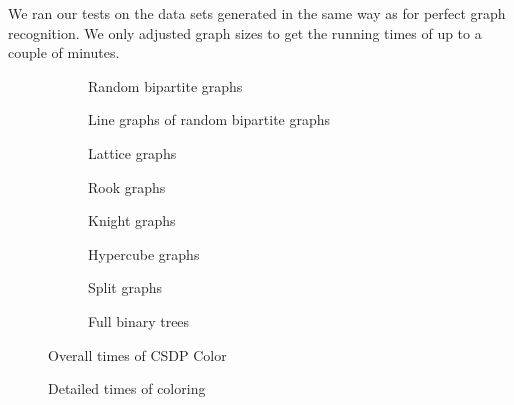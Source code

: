 We ran our tests on the data sets generated in the same way as for perfect graph recognition. We only adjusted graph sizes to get the running times of up to a couple of minutes. 

\begin{figure}
  \begin{subfigure}{.5\textwidth}
    \centering
    
    \caption{Random bipartite graphs}
  \end{subfigure}%
  \begin{subfigure}{.5\textwidth}
    \centering
    
    \caption{Line graphs of random bipartite graphs}
  \end{subfigure}
  \begin{subfigure}{.5\textwidth}
    \centering
    
    \caption{Lattice graphs}
  \end{subfigure}%
  \begin{subfigure}{.5\textwidth}
    \centering
    
    \caption{Rook graphs}
  \end{subfigure}
  \begin{subfigure}{.5\textwidth}
    \centering
    
    \caption{Knight graphs}
  \end{subfigure}%
  \begin{subfigure}{.5\textwidth}
    \centering%
    
    \caption{Hypercube graphs}
  \end{subfigure}
  \begin{subfigure}{.5\textwidth}
    \centering
    
    \caption{Split graphs}
  \end{subfigure}%
  \begin{subfigure}{.5\textwidth}
    \centering
    
    \caption{Full binary trees}
  \end{subfigure}
  \caption{Overall times of CSDP Color}
  \label{fig:CSDPLines}
\end{figure}

\begin{figure}
  \centering
  
  \caption{Detailed times of coloring}
  \label{fig:CSDPDet}
\end{figure}


